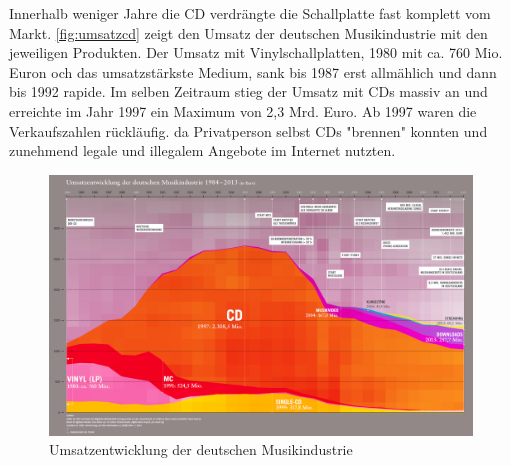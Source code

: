 Innerhalb weniger Jahre die CD verdrängte die Schallplatte fast komplett vom
Markt. \autoref{fig:umsatzcd} zeigt den Umsatz der deutschen Musikindustrie mit
den jeweiligen Produkten. Der Umsatz mit Vinylschallplatten, 1980 mit ca. 760
Mio. Euron och das umsatzstärkste Medium, sank bis 1987 erst allmählich und
dann bis 1992 rapide. Im selben Zeitraum stieg der Umsatz mit CDs massiv an und
erreichte im Jahr 1997 ein Maximum von 2,3 Mrd. Euro. Ab 1997 waren die
Verkaufszahlen rückläufig. da Privatperson selbst CDs
"brennen" konnten und zunehmend legale und
illegalem Angebote im Internet nutzten.

\begin{figure}[h]
    \begin{center}
        \begin{minipage}[t]{\textwidth}
            \begin{center}
                \includegraphics[width=\textwidth]{Bilder/Optische_Datentraeger_Die_Compact_Disc/Geschichte/umsatzcd.png}
                \caption[Umsatzentwicklung der deutschen Musikindustrie \newline \url{http://www.musikindustrie.de/uploads/media/140325\_BVMI\_2013\_Jahrbuch\_ePaper\_V02.pdf} S. 7 (zuletzt aufgerufen am 03.08.2015)]{Umsatzentwicklung der deutschen Musikindustrie}
                \label{fig:umsatzcd}
            \end{center}
        \end{minipage}
    \end{center}
\end{figure}
